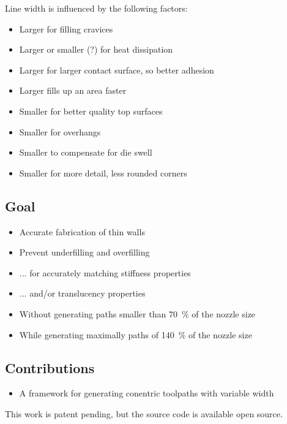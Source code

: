Line width is influenced by the following factors:
\begin{itemize}
\item Larger for filling cravices
\item Larger or smaller (?) for heat dissipation
\item Larger for larger contact surface, so better adhesion \cite{N.Turner2014}
\item Larger fills up an area faster \cite{ahn2002anisotropic}
\item Smaller for better quality top surfaces \cite{ahn2002anisotropic}
\item Smaller for overhangs
\item Smaller to compensate for die swell
\item Smaller for more detail, less rounded corners \cite{N.Turner2014}
\end{itemize}

\subsection{Goal}
\begin{itemize}
\item Accurate fabrication of thin walls
\item Prevent underfilling and overfilling
\item ... for accurately matching stiffness properties
\item ... and/or translucency properties
\item Without generating paths smaller than \SI{70}{\percent} of the nozzle size
\item While generating maximally paths of \SI{140}{\percent} of the nozzle size
\end{itemize}



\subsection{Contributions}
\begin{itemize}
\item A framework for generating conentric toolpaths with variable width
\end{itemize}

This work is patent pending, but the source code is available open source.

